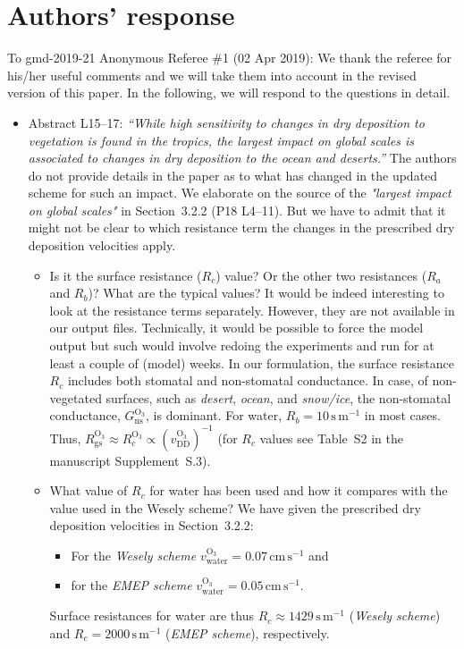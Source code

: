 \documentclass{scrartcl}
\begin{document}
\section*{Authors' response}
To gmd-2019-21 Anonymous Referee \#1 (02 Apr 2019):
We thank the referee for his/her useful comments and we will take them into account in the revised version of this paper.
In the following, we will respond to the questions in detail.
\begin{itemize}
\item {\color{blue}  Abstract L15--17: \emph{“While high sensitivity to changes in dry deposition to
    vegetation is found in the tropics, the largest impact on global scales is associated to
    changes in dry deposition to the ocean and deserts.”} The authors do not provide details
  in the paper as to what has changed in the updated scheme for such an impact.}
  We elaborate on the source of the \emph{"largest impact on global scales"} in Section~3.2.2 (P18 L4--11). But we have to admit that it might not be clear to which resistance term the changes in the prescribed dry deposition velocities apply. 
  \begin{itemize}
  \item {\color{blue} Is it the surface resistance ($R_c$) value? Or the other two resistances ($R_a$ and $R_b$)? What are the typical values?}
    It would be indeed interesting to look at the resistance terms separately. However, they are not available in our output files.
    Technically, it would be possible to force the model output but such would involve redoing the experiments and run for at least a couple of (model) weeks. In our formulation, the surface resistance $R_c$ includes both stomatal and non-stomatal conductance. In case, of non-vegetated surfaces, such as \emph{desert}, \emph{ocean}, and \emph{snow/ice}, the non-stomatal conductance, $G_\mathrm{ns}^\mathrm{O_3}$, is dominant. For water, $R_b = 10\,\mathrm{s\,m^{-1}}$ in most cases. Thus, $R_\mathrm{gs}^\mathrm{O_3} \approx R_c^\mathrm{O_3} \propto (v_\mathrm{DD}^\mathrm{O_3})^{-1}$ (for $R_c$ values see Table~S2 in the manuscript Supplement~S.3).
  \item {\color{blue} What value of $R_c$ for water has been used and how it compares with the value used in the Wesely scheme?}
    We have given the prescribed dry deposition velocities in Section~3.2.2:
    \begin{itemize}
      \item For the \emph{Wesely scheme}
        $v_\mathrm{water}^\mathrm{O_3} = 0.07\,\mathrm{cm\,s^{-1}}$ and
        \item for the \emph{EMEP scheme}
          $v_\mathrm{water}^\mathrm{O_3} = 0.05\,\mathrm{cm\,s^{-1}}$.
    \end{itemize}
    Surface resistances for water are thus $R_c \approx 1429\,\mathrm{s\,m^{-1}}$ (\emph{Wesely scheme}) and $R_c = 2000\,\mathrm{s\,m^{-1}}$ (\emph{EMEP scheme}), respectively.
  \end{itemize}


\end{itemize}
\end{document}
